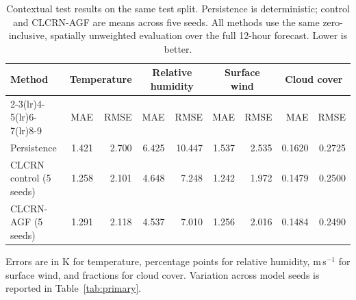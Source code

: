 \begin{table}[htbp]
\caption{Contextual test results on the same test split. Persistence is deterministic; control and CLCRN-AGF are means across five seeds. All methods use the same zero-inclusive, spatially unweighted evaluation over the full 12-hour forecast. Lower is better.}
\label{tab:context}
\centering
\small
\begin{tabular}{lrrrrrrrr}
\toprule
Method & \multicolumn{2}{c}{Temperature} & \multicolumn{2}{c}{Relative humidity} & \multicolumn{2}{c}{Surface wind} & \multicolumn{2}{c}{Cloud cover}\\
\cmidrule(lr){2-3}\cmidrule(lr){4-5}\cmidrule(lr){6-7}\cmidrule(lr){8-9}
& MAE & RMSE & MAE & RMSE & MAE & RMSE & MAE & RMSE\\
\midrule
Persistence & 1.421 & 2.700 & 6.425 & 10.447 & 1.537 & 2.535 & 0.1620 & 0.2725 \\
CLCRN control (5 seeds) & 1.258 & 2.101 & 4.648 & 7.248 & 1.242 & 1.972 & 0.1479 & 0.2500 \\
CLCRN-AGF (5 seeds) & 1.291 & 2.118 & 4.537 & 7.010 & 1.256 & 2.016 & 0.1484 & 0.2490 \\
\bottomrule
\end{tabular}
\vspace{2pt}\par\parbox{\linewidth}{\footnotesize Errors are in K for temperature, percentage points for relative humidity, m\,s$^{-1}$ for surface wind, and fractions for cloud cover. Variation across model seeds is reported in Table~\ref{tab:primary}.}
\end{table}
